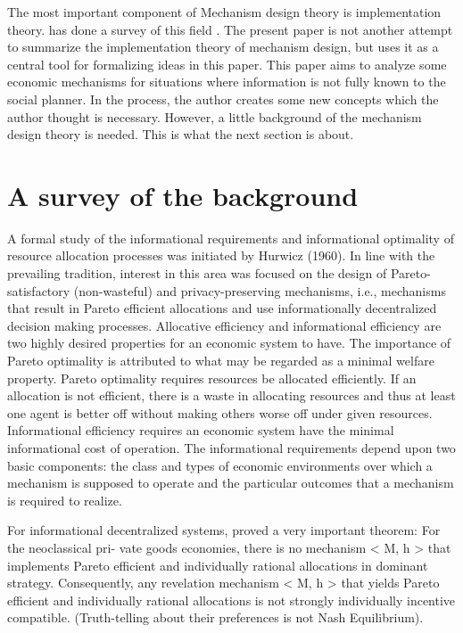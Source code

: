  The most important
component of Mechanism design theory is implementation
theory. \parencite{Liang2010} has done a survey of this field
.  The present paper is not another attempt to summarize the
implementation theory of mechanism design, but uses it as  a central tool for formalizing ideas
in this paper. This paper aims  to analyze some
economic mechanisms for situations where information  is not
fully known to the social planner. In the process, the author creates some new
concepts which the author thought is necessary. However, a little
background of the mechanism design theory is needed. This is what the next
section is about.

\section{A survey of the background}

A formal study of the informational requirements and informational optimality of resource
allocation processes was initiated by Hurwicz (1960).  In line with the prevailing tradition, interest in this area was focused
on the design of Pareto-satisfactory (non-wasteful) and privacy-preserving mechanisms, i.e.,
mechanisms that result in Pareto efficient allocations and use informationally decentralized
decision making processes.  Allocative efficiency and informational efficiency are two highly
desired properties for an economic system to have.  The importance of Pareto optimality is
attributed to what may be regarded as a minimal welfare property. Pareto optimality requires
resources be allocated efficiently. If an allocation is not efficient, there is a waste in allocating
resources and thus at least one agent is better off without making others worse off under given
resources. Informational efficiency requires an economic system have the minimal informational
cost of operation. The informational requirements depend upon two basic components: the class
and types of economic environments over which a mechanism is supposed to operate and the
particular outcomes that a mechanism is required to realize.

For informational decentralized systems, \parencite{Hurwicz1972}
proved a very important theorem: For the neoclassical pri-
vate goods economies, there is no mechanism < M, h > that implements Pareto efficient
and individually rational allocations in dominant strategy. Consequently, any revelation
mechanism < M, h > that yields Pareto efficient and individually rational allocations is
not strongly individually incentive compatible. (Truth-telling about their preferences is not
Nash Equilibrium).

